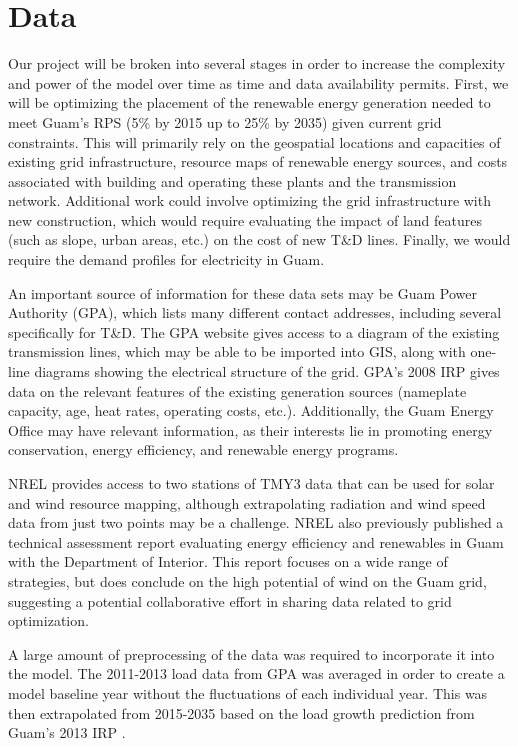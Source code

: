 \documentclass[12pt,letterpaper,fleqn]{report}
\begin{document}
\section{Data}

Our project will be broken into several stages in order to increase
the complexity and power of the model over time as time and data
availability permits. First, we will be optimizing the placement of
the renewable energy generation needed to meet Guam’s RPS (5\% by 2015
up to 25\% by 2035) given current grid constraints. This will
primarily rely on the geospatial locations and capacities of existing
grid infrastructure, resource maps of renewable energy sources, and
costs associated with building and operating these plants and the
transmission network. Additional work could involve optimizing the
grid infrastructure with new construction, which would require
evaluating the impact of land features (such as slope, urban areas,
etc.) on the cost of new T\&D lines. Finally, we would require the
demand profiles for electricity in Guam.

An important source of information for these data sets may be Guam
Power Authority (GPA), which lists many different contact addresses,
including several specifically for T\&D. The GPA website gives access
to a diagram of the existing transmission lines, which may be able to
be imported into GIS, along with one-line diagrams showing the
electrical structure of the grid. GPA’s 2008 IRP gives data on the
relevant features of the existing generation sources (nameplate
capacity, age, heat rates, operating costs, etc.). Additionally, the
Guam Energy Office may have relevant information, as their interests
lie in promoting energy conservation, energy efficiency, and renewable
energy programs.

NREL provides access to two stations of TMY3 data that can be used for
solar and wind resource mapping, although extrapolating radiation and
wind speed data from just two points may be a challenge. NREL also
previously published a technical assessment report evaluating energy
efficiency and renewables in Guam with the Department of
Interior. This report focuses on a wide range of strategies, but does
conclude on the high potential of wind on the Guam grid, suggesting a
potential collaborative effort in sharing data related to grid
optimization.

A large amount of preprocessing of the data was required to
incorporate it into the model. The 2011-2013 load data from GPA was
averaged in order to create a model baseline year without the
fluctuations of each individual year. This was then extrapolated from
2015-2035 based on the load growth prediction from Guam's 2013 IRP
\cite{gpa13a}. 
\end{document}
